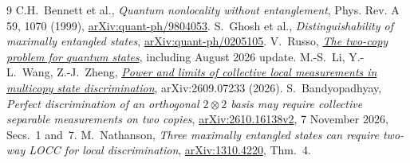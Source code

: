 \documentclass[10pt]{article}
\begin{document}
\begin{thebibliography}{9}\setlength{\itemsep}{0pt}
 C.H.~Bennett et al., \emph{Quantum nonlocality without entanglement}, Phys. Rev. A 59, 1070 (1999), \href{https://arxiv.org/abs/quant-ph/9804053}{arXiv:quant-ph/9804053}.
 S.~Ghosh et al., \emph{Distinguishability of maximally entangled states}, \href{https://arxiv.org/abs/quant-ph/0205105}{arXiv:quant-ph/0205105}.
 V.~Russo, \href{https://vprusso.github.io/posts/two_copy_problem/}{\emph{The two-copy problem for quantum states}}, including August 2026 update.
 M.-S.~Li, Y.-L.~Wang, Z.-J.~Zheng, \href{https://arxiv.org/abs/2609.07233}{\emph{Power and limits of collective local measurements in multicopy state discrimination}}, arXiv:2609.07233 (2026).
 S.~Bandyopadhyay, \emph{Perfect discrimination of an orthogonal $2\otimes2$ basis may require collective separable measurements on two copies}, \href{https://arxiv.org/html/2610.16138v2}{arXiv:2610.16138v2}, 7 November 2026, Secs.~1 and~7.
 M.~Nathanson, \emph{Three maximally entangled states can require two-way LOCC for local discrimination}, \href{https://arxiv.org/abs/1310.4220}{arXiv:1310.4220}, Thm.~4.
\end{thebibliography}
\end{document}

